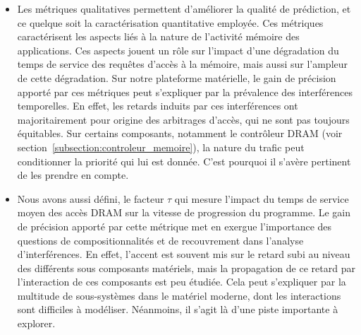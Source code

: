 \begin{itemize}
	\item Les métriques qualitatives permettent d'améliorer la qualité de prédiction, et ce quelque soit la caractérisation quantitative employée.
	Ces métriques caractérisent les aspects liés à la nature de l'activité mémoire des applications.
	Ces aspects jouent un rôle sur l'impact d'une dégradation du temps de service des requêtes d'accès à la mémoire, mais aussi sur l'ampleur de cette dégradation.
	Sur notre plateforme matérielle, le gain de précision apporté par ces métriques peut s'expliquer par la prévalence des interférences temporelles.
	En effet, les retards induits par ces interférences ont majoritairement pour origine des arbitrages d'accès, qui ne sont pas toujours équitables.
	Sur certains composants, notamment le contrôleur DRAM (voir section~\ref{subsection:controleur_memoire}), la nature du trafic peut conditionner la priorité qui lui est donnée.
	C'est pourquoi il s'avère pertinent de les prendre en compte.

	\item 	Nous avons aussi défini, le facteur $\tau$ qui mesure l'impact du temps de service moyen des accès DRAM sur la vitesse de progression du programme.
	Le gain de précision apporté par cette métrique met en exergue l'importance des questions de compositionnalités et de recouvrement dans l'analyse d'interférences.
	En effet, l'accent est souvent mis sur le retard subi au niveau des différents sous composants matériels, mais la propagation de ce retard par l'interaction de ces composants est peu étudiée.
	Cela peut s'expliquer par la multitude de sous-systèmes dans le matériel moderne, dont les interactions sont difficiles à modéliser.
	Néanmoins, il s'agit là d'une piste importante à explorer.


\end{itemize}
